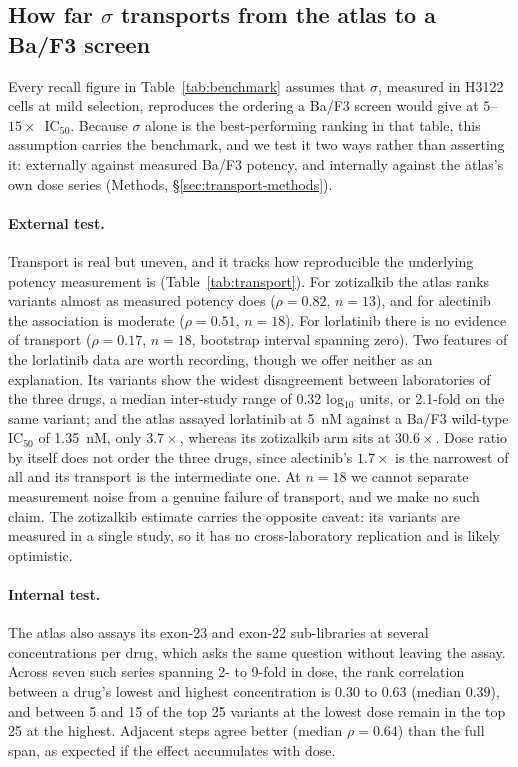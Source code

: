 \documentclass[11pt,a4paper]{article}
\begin{document}
\subsection{How far \texorpdfstring{$\sigma$}{sigma} transports from the atlas to a Ba/F3 screen}
\label{sec:transport}

Every recall figure in Table~\ref{tab:benchmark} assumes that $\sigma$,
measured in H3122 cells at mild selection, reproduces the ordering a Ba/F3
screen would give at $5$--$15\times$~IC$_{50}$. Because $\sigma$ alone is the
best-performing ranking in that table, this assumption carries the
benchmark, and we test it two ways rather than asserting it: externally
against measured Ba/F3 potency, and internally against the atlas's own
dose series (Methods, \S\ref{sec:transport-methods}).

\paragraph{External test.}
Transport is real but uneven, and it tracks how reproducible the
underlying potency measurement is (Table~\ref{tab:transport}). For
zotizalkib the atlas ranks variants almost as measured potency does
($\rho = 0.82$, $n = 13$), and for alectinib the association is moderate
($\rho = 0.51$, $n = 18$). For lorlatinib there is no evidence of
transport ($\rho = 0.17$, $n = 18$, bootstrap interval spanning zero).
Two features of the lorlatinib data are worth recording, though we
offer neither as an explanation. Its variants show the widest
disagreement between laboratories of the three drugs, a median
inter-study range of 0.32 log$_{10}$ units, or 2.1-fold on the same
variant; and the atlas assayed lorlatinib at 5~nM against a Ba/F3
wild-type IC$_{50}$ of 1.35~nM, only $3.7\times$, whereas its zotizalkib
arm sits at $30.6\times$. Dose ratio by itself does not order the three
drugs, since alectinib's $1.7\times$ is the narrowest of all and its
transport is the intermediate one. At $n = 18$ we cannot separate
measurement noise from a genuine failure of transport, and we make no such
claim. The zotizalkib estimate carries the opposite caveat: its variants
are measured in a single study, so it has no cross-laboratory
replication and is likely optimistic.

\paragraph{Internal test.}
The atlas also assays its exon-23 and exon-22 sub-libraries at several
concentrations per drug, which asks the same question without leaving
the assay. Across seven such series spanning 2- to 9-fold in dose, the
rank correlation between a drug's lowest and highest concentration is
0.30 to 0.63 (median 0.39), and between 5 and 15 of the top 25 variants
at the lowest dose remain in the top 25 at the highest. Adjacent steps
agree better (median $\rho = 0.64$) than the full span, as expected if
the effect accumulates with dose.
\end{document}

